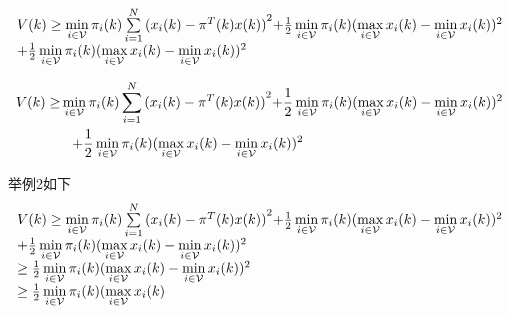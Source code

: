 \[\begin{array}{l}
V(k) \ge \mathop {\min }\limits_{i \in {\cal V}} {\pi _i}(k)\sum\limits_{i = 1}^N {{{({x_i}(k) - {\pi ^T}(k)x(k))}^2}} {\rm{ + }}\frac{1}{2}\mathop {\min }\limits_{i \in {\cal V}} {\pi _i}(k){(\mathop {\max }\limits_{i \in {\cal V}} {x_i}(k) - \mathop {\min }\limits_{i \in {\cal V}} {x_i}(k))^2}\\
{\rm{ + }}\frac{1}{2}\mathop {\min }\limits_{i \in {\cal V}} {\pi _i}(k){(\mathop {\max }\limits_{i \in {\cal V}} {x_i}(k) - \mathop {\min }\limits_{i \in {\cal V}} {x_i}(k))^2}
\end{array}\]

\begin{equation}\label{system3}
  \begin{split}
V(k) \ge& \mathop {\min }\limits_{i \in {\cal V}} {\pi _i}(k)\sum\limits_{i = 1}^N {{{({x_i}(k) - {\pi ^T}(k)x(k))}^2}} {\rm{ + }}\frac{1}{2}\mathop {\min }\limits_{i \in {\cal V}} {\pi _i}(k){(\mathop {\max }\limits_{i \in {\cal V}} {x_i}(k) - \mathop {\min }\limits_{i \in {\cal V}} {x_i}(k))^2}\\
&\hspace{0.3cm}{\rm{ + }}\frac{1}{2}\mathop {\min }\limits_{i \in {\cal V}} {\pi _i}(k){(\mathop {\max }\limits_{i \in {\cal V}} {x_i}(k) - \mathop {\min }\limits_{i \in {\cal V}} {x_i}(k))^2}
  \end{split}
\end{equation}

举例2如下
\[\begin{array}{l}
V(k) \ge \mathop {\min }\limits_{i \in {\cal V}} {\pi _i}(k)\sum\limits_{i = 1}^N {{{({x_i}(k) - {\pi ^T}(k)x(k))}^2}} {\rm{ + }}\frac{1}{2}\mathop {\min }\limits_{i \in {\cal V}} {\pi _i}(k){(\mathop {\max }\limits_{i \in {\cal V}} {x_i}(k) - \mathop {\min }\limits_{i \in {\cal V}} {x_i}(k))^2}\\
{\rm{ + }}\frac{1}{2}\mathop {\min }\limits_{i \in {\cal V}} {\pi _i}(k){(\mathop {\max }\limits_{i \in {\cal V}} {x_i}(k) - \mathop {\min }\limits_{i \in {\cal V}} {x_i}(k))^2}\\
 \ge \frac{1}{2}\mathop {\min }\limits_{i \in {\cal V}} {\pi _i}(k){(\mathop {\max }\limits_{i \in {\cal V}} {x_i}(k) - \mathop {\min }\limits_{i \in {\cal V}} {x_i}(k))^2}\\
 \ge \frac{1}{2}\mathop {\min }\limits_{i \in {\cal V}} {\pi _i}(k)(\mathop {\max }\limits_{i \in {\cal V}} {x_i}(k)
\end{array}\]




